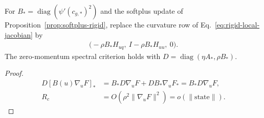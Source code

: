 \begin{corollary}
For $B_*=\operatorname{diag}(\psi'(c_{g,*})^2)$ and the softplus update of Proposition~\ref{prop:softplus-rigid}, replace the curvature row of Eq.~\eqref{eq:rigid-local-jacobian} by
\begin{align}
 \bigl(-\rho B_*H_{uq},\ I-\rho B_*H_{uu},\ 0\bigr).
\end{align}
The zero-momentum spectral criterion holds with
$D=\operatorname{diag}(\eta A_*,\rho B_*)$.
\end{corollary}
\begin{proof}
\begin{align}
 D[B(u)\nabla_uF]_*&=B_*D\nabla_uF+DB_*\nabla_uF_*=B_*D\nabla_uF,\\
 R_c&=O(\rho^2\|\nabla_uF\|^2)=o(\|\mathrm{state}\|).
\end{align}
\end{proof}

